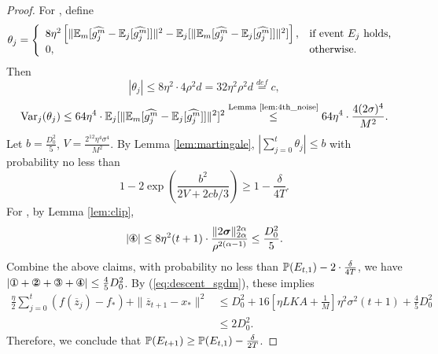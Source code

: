 \documentclass{article} %
\numberwithin{equation}{section}
\newcommand{\cirone}{\text{\ding{172}}}
\newcommand{\cirtwo}{\text{\ding{173}}}
\newcommand{\cirthree}{\text{\ding{174}}}
\newcommand{\cirfour}{\text{\ding{175}}}
\renewcommand{\eqref}[1]{(\ref{#1})}
\begin{document}
\begin{proof}
    For \cirthree, define
    \begin{equation}
        \theta_j=\left\{
            \begin{array}{ll}
                8\eta^2\left[\|\mathbb{E}_m [\widehat{g_j^m}-\mathbb{E}_j[\widehat{g_j^m}]]\|^2-\mathbb{E}_j[\|\mathbb{E}_m [\widehat{g_j^m}-\mathbb{E}_j[\widehat{g_j^m}]]\|^2]\right], & \text{if event $E_j$ holds, } \\
                0 ,& \text{otherwise.}
            \end{array}
        \right.
    \end{equation}
    Then 
    \begin{equation}
        |\theta_j|\leq 8\eta^2 \cdot 4\rho^2d=32\eta^2\rho^2d\overset{def}{=}c,
    \end{equation}
    \begin{equation}
        \mathrm{Var}_j(\theta_j)\leq 64\eta^4\cdot \mathbb{E}_j [\|\mathbb{E}_m [\widehat{g_j^m}-\mathbb{E}_j[\widehat{g_j^m}]]\|^2]^2
        \overset{\text{Lemma \ref{lem:4th_noise}}}{\leq} 64\eta^4\cdot \frac{4(2\sigma)^4}{M^2}.
    \end{equation}
    Let $b=\frac{D_0^2}{5}$, $V=\frac{2^{12}\eta^4\sigma^4}{M^2}$.
    By Lemma \ref{lem:martingale}, $|\sum_{j=0}^t\theta_j|\leq b$ with probability no less than
    \begin{equation}
        1-2\exp\left(\frac{b^2}{2V+2cb/3}\right)\geq 1-\frac{\delta}{4T}.
    \end{equation}
    For \cirfour, by Lemma \ref{lem:clip},
    \begin{equation}
        |\cirfour|\leq 8\eta^2(t+1)\cdot\frac{\|2\boldsymbol{\sigma}\|_{2\alpha}^{2\alpha}}{\rho^{2(\alpha-1)}}\leq \frac{D_0^2}{5}.
    \end{equation}
    Combine the above claims, with probability no less than $\mathbb{P}(E_{t,1})-2\cdot\frac{\delta}{4T}$, we have $|\cirone+\cirtwo+\cirthree+\cirfour|\leq \frac{4}{5}D_0^2$. By \eqref{eq:descent_sgdm}, these implies
    \begin{equation}
        \begin{aligned}
            \frac{\eta}{2}\sum_{j=0}^t(f(\overline{z}_j)-f_*)+\|\overline{z}_{t+1}-x_*\|^2
            &\leq D_0^2 + 16\left[\eta LKA+\frac{1}{M}\right]\eta^2\sigma^2(t+1) + \frac{4}{5}D_0^2 \\
            &\leq 2D_0^2.
        \end{aligned}
    \end{equation}
    Therefore, we conclude that $\mathbb{P}(E_{t+1})\geq \mathbb{P}(E_{t,1})-\frac{\delta}{2T}$.
    
\end{proof}
\end{document}
